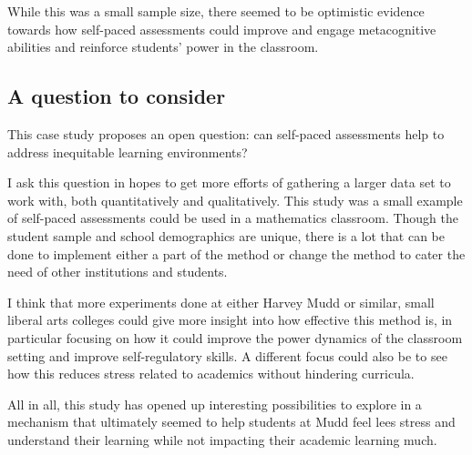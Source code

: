 While this was a small sample size, there seemed to be optimistic evidence towards how self-paced assessments could improve and engage metacognitive abilities and reinforce students' power in the classroom.

\subsection{A question to consider}

This case study proposes an open question: can self-paced assessments help to address inequitable learning environments?

I ask this question in hopes to get more efforts of gathering a larger data set to work with, both quantitatively and qualitatively. This study was a small example of self-paced assessments could be used in a mathematics classroom. Though the student sample and school demographics are unique, there is a lot that can be done to implement either a part of the method or change the method to cater the need of other institutions and students.

I think that more experiments done at either Harvey Mudd or similar, small liberal arts colleges could give more insight into how effective this method is, in particular focusing on how it could improve the power dynamics of the classroom setting and improve self-regulatory skills. A different focus could also be to see how this reduces stress related to academics without hindering curricula.

All in all, this study has opened up interesting possibilities to explore in a mechanism that ultimately seemed to help students at Mudd feel lees stress and understand their learning while not impacting their academic learning much.

